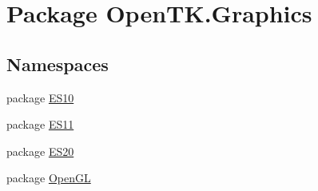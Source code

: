 \hypertarget{namespace_open_t_k_1_1_graphics}{\section{Package Open\-T\-K.\-Graphics}
\label{namespace_open_t_k_1_1_graphics}
}
\subsection*{Namespaces}
\begin{DoxyCompactItemize}
\item 
package \hyperlink{namespace_open_t_k_1_1_graphics_1_1_e_s10}{E\-S10}
\item 
package \hyperlink{namespace_open_t_k_1_1_graphics_1_1_e_s11}{E\-S11}
\item 
package \hyperlink{namespace_open_t_k_1_1_graphics_1_1_e_s20}{E\-S20}
\item 
package \hyperlink{namespace_open_t_k_1_1_graphics_1_1_open_g_l}{Open\-G\-L}
\end{DoxyCompactItemize}
